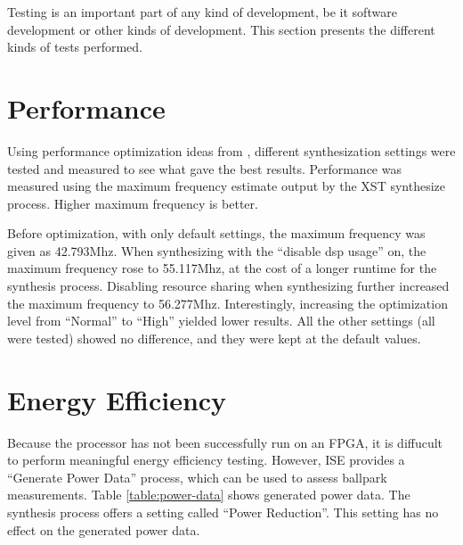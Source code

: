 Testing is an important part of any kind of development, be it software development or other kinds of development.
This section presents the different kinds of tests performed.

\section{Performance}
\label{sec:results-performance}

Using performance optimization ideas from \cite{xilinx-speed-strategies}, different synthesization settings were tested and measured to see what gave the best results.
Performance was measured using the maximum frequency estimate output by the XST synthesize process.
Higher maximum frequency is better.

Before optimization, with only default settings, the maximum frequency was given as 42.793Mhz.
When synthesizing with the ``disable dsp usage'' on, the maximum frequency rose to 55.117Mhz, at the cost of a longer runtime for the synthesis process.
Disabling resource sharing when synthesizing further increased the maximum frequency to 56.277Mhz.
Interestingly, increasing the optimization level from ``Normal'' to ``High'' yielded lower results.
All the other settings (all were tested) showed no difference, and they were kept at the default values.

\section{Energy Efficiency}

Because the processor has not been successfully run on an FPGA, it is diffucult to perform meaningful energy efficiency testing.
However, ISE provides a ``Generate Power Data'' process, which can be used to assess ballpark measurements.
Table \vref{table:power-data} shows generated power data.
The synthesis process offers a setting called ``Power Reduction''.
This setting has no effect on the generated power data.

